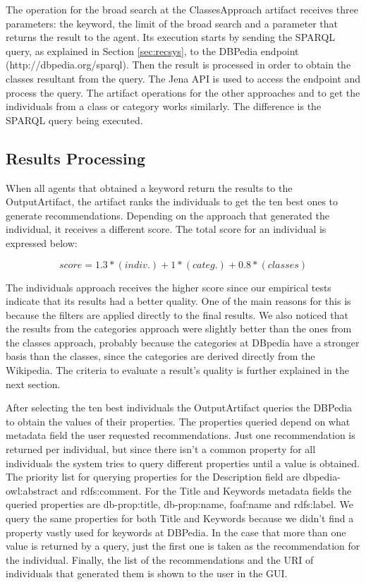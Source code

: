 \documentclass[a4paper,twoside]{article}
\begin{document}
The operation for the broad search at the ClassesApproach artifact receives three parameters: the keyword, the limit of the broad search and a parameter that returns the result to the agent. Its execution starts by sending the SPARQL query, as explained in Section \ref{sec:recsys}, to the DBPedia endpoint (http://dbpedia.org/sparql). Then the result is processed in order to obtain the classes resultant from the query. The Jena API is used to access the endpoint and process the query. The artifact operations for the other approaches and to get the individuals from a class or category works similarly. The difference is the SPARQL query being executed.

\subsection{Results Processing}

\noindent When all agents that obtained a keyword return the results to the OutputArtifact, the artifact ranks the individuals to get the ten best ones to generate recommendations. Depending on the approach that generated the individual, it receives a different score. The total score for an individual is expressed below:

\begin{equation}\label{eqX}
score = 1.3*(indiv.) + 1*(categ.) + 0.8*(classes)
\end{equation}

The individuals approach receives the higher score since our empirical tests indicate that its results had a better quality. One of the main reasons for this is because the filters are applied directly to the final results. We also noticed that the results from the categories approach were slightly better than the ones from the classes approach, probably because the categories at DBpedia have a stronger basis than the classes, since the categories are derived directly from the Wikipedia. The criteria to evaluate a result's quality is further explained in the next section.

After selecting the ten best individuals the OutputArtifact queries the DBPedia to obtain the values of their properties. The properties queried depend on what metadata field the user requested recommendations. Just one recommendation is returned per individual, but since there isn't a common property for all individuals the system tries to query different properties until a value is obtained. The priority list for querying properties for the Description field are dbpedia-owl:abstract and rdfs:comment. For the Title and Keywords metadata fields the queried properties are db-prop:title, db-prop:name, foaf:name and rdfs:label. We query the same properties for both Title and Keywords because we didn't find a property vastly used for keywords at DBPedia. In the case that more than one value is returned by a query, just the first one is taken as the recommendation for the individual. Finally, the list of the recommendations and the URI of individuals that generated them is shown to the user in the GUI.
\end{document}
